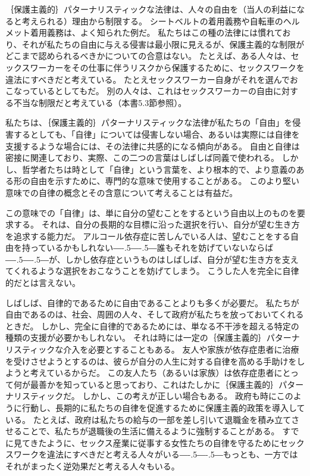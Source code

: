 \documentclass[paper=a4,book,openany]{jlreq}
\def\DDASH{―\kern-.5\zw―\kern-.5\zw―} %
\begin{document}
｛保護主義的｝{パターナリスティック}な法律は、人々の自由を（当人の利益になると考えられる）理由から制限する。
シートベルトの着用義務や自転車のヘルメット着用義務は、よく知られた例だ。
私たちはこの種の法律には慣れており、それが私たちの自由に与える侵害は最小限に見えるが、保護主義的な制限がどこまで認められるべきかについての合意はない。
たとえば、ある人々は、セックスワーカーをその仕事に伴うリスクから保護するために、セックスワークを違法にすべきだと考えている。
たとえセックスワーカー自身がそれを選んでおこなっているとしてもだ。
別の人々は、これはセックスワーカーの自由に対する不当な制限だと考えている（本書5.3節参照）。

私たちは、｛保護主義的｝{パターナリスティック}な法律が私たちの「自由」を侵害するとしても、「自律」については侵害しない場合、あるいは実際には自律を支援するような場合には、その法律に共感的になる傾向がある。
自由と自律は密接に関連しており、実際、この二つの言葉はしばしば同義で使われる。
しかし、哲学者たちは時として「自律」という言葉を、より根本的で、より意義のある形の自由を示すために、専門的な意味で使用することがある。
このより堅い意味での自律の概念とその含意について考えることは有益だ。

この意味での「自律」は、単に自分の望むことをするという自由以上のものを要求する。
それは、自分の長期的な目標に沿った選択を行い、自分が望む生き方を追求する能力だ。
アルコール依存症に苦しんでいる人は、望むことをする自由を持っているかもしれない{\DDASH}誰もそれを妨げていないならば{\DDASH}が、しかし依存症というものはしばしば、自分が望む生き方を支えてくれるような選択をおこなうことを妨げてしまう。
こうした人を完全に自律的だとは言えない。

しばしば、自律的であるために自由であることよりも多くが必要だ。
私たちが自由であるのは、社会、周囲の人々、そして政府が私たちを放っておいてくれるときだ。
しかし、完全に自律的であるためには、単なる不干渉を超える特定の種類の支援が必要かもしれない。
それは時には一定の｛保護主義的｝{パターナリスティック}な介入を必要とすることもある。
友人や家族が依存症患者に治療を受けさせようとするのは、彼らが自分の人生に対する自律を高める手助けをしようと考えているからだ。
この友人たち（あるいは家族）は依存症患者にとって何が最善かを知っていると思っており、これはたしかに｛保護主義的｝{パターナリスティック}だ。
しかし、この考えが正しい場合もある。
政府も時にこのように行動し、長期的に私たちの自律を促進するために保護主義的政策を導入している。
たとえば、政府は私たちの給与の一部を差し引いて退職金を積み立てさせることで、私たちが退職後の生活に備えるように強制することがある。
すでに見てきたように、セックス産業に従事する女性たちの自律を守るためにセックスワークを違法にすべきだと考える人々がいる{\DDASH}もっとも、一方ではそれがまったく逆効果だと考える人々もいる。
\end{document}
